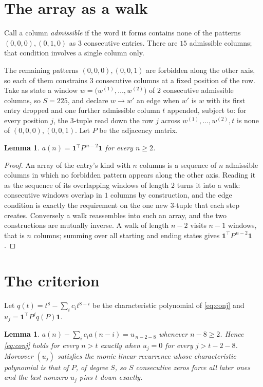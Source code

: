 \documentclass[11pt,a4paper]{article}
\theoremstyle{plain}
\newtheorem{lemma}[theorem]{Lemma}
\theoremstyle{definition}
\begin{document}
\section{The array as a walk}

Call a column \emph{admissible} if the word it forms contains none of the patterns
$(0,0,0), (0,1,0)$ as $3$ consecutive entries. There are $15$ admissible columns; that condition
involves a single column only.

The remaining patterns $(0,0,0), (0,0,1)$ are forbidden along the other axis, so each of them
constrains $3$ consecutive columns at a fixed position of the row. Take as state a
window $w=\bigl(w^{(1)},\dots,w^{(2)}\bigr)$ of $2$ consecutive admissible
columns, so $S=225$, and declare $w\to w'$ an edge when $w'$ is $w$ with its first entry
dropped and one further admissible column $t$ appended, subject to: for every position
$j$, the $3$-tuple read down the row $j$ across $w^{(1)},\dots,w^{(2)},t$
is none of $(0,0,0), (0,0,1)$. Let $P$ be the adjacency matrix.

\begin{lemma}\label{lem:walk}
$a(n)=\mathbf{1}^{\!\top}P^{\,n-2}\mathbf{1}$ for every $n\ge2$.
\end{lemma}

\begin{proof}
An array of the entry's kind with $n$ columns is a sequence of $n$ admissible columns in
which no forbidden pattern appears along the other axis. Reading it as the sequence of its
overlapping windows of length $2$ turns it into a walk: consecutive windows overlap in
$1$ columns by construction, and the edge condition is exactly the requirement on the one
new $3$-tuple that each step creates. Conversely a walk reassembles into such an array,
and the two constructions are mutually inverse. A walk of length $n-2$ visits $n-1$
windows, that is $n$ columns; summing over all starting and ending states gives
$\mathbf{1}^{\!\top}P^{\,n-2}\mathbf{1}$.
\end{proof}

\section{The criterion}

Let $q(t)=t^{8}-\sum_i c_i t^{8-i}$ be the characteristic polynomial of
\eqref{eq:conj} and $u_j=\mathbf{1}^{\!\top}P^{j}q(P)\mathbf{1}$.

\begin{lemma}\label{lem:crit}
$a(n)-\sum_i c_i a(n-i)=u_{\,n-2-8}$ whenever $n-8\ge2$. Hence
\eqref{eq:conj} holds for every $n>t$ exactly when $u_j=0$ for every
$j>t-2-8$. Moreover $(u_j)$ satisfies the monic linear recurrence whose
characteristic polynomial is that of $P$, of degree $S$, so $S$ consecutive zeros force all
later ones and the last nonzero $u_j$ pins $t$ down exactly.
\end{lemma}
\end{document}

